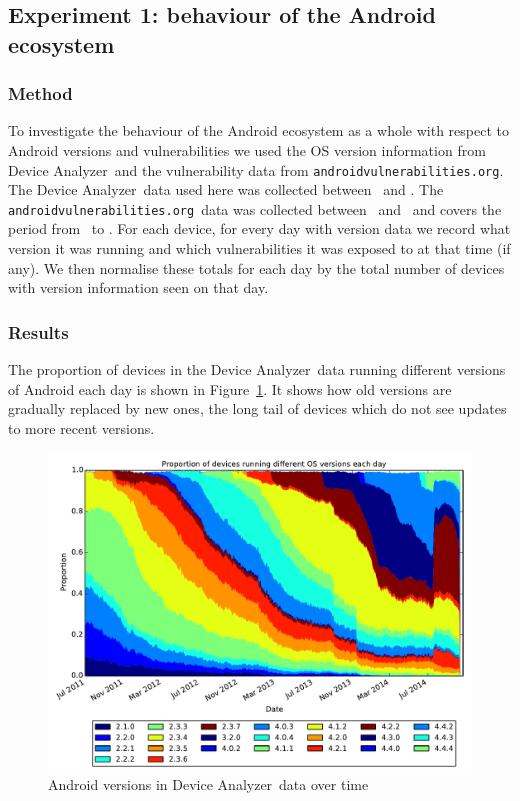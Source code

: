 \documentclass[conference,a4paper,twoside]{IEEEtran}
\newcommand{\da}{Device Analyzer}
\newcommand{\avo}{\texttt{androidvulnerabilities.org}}
\begin{document}

\subsection{Experiment 1: behaviour of the Android ecosystem}\label{sec:exp:android_ecosystem}

\subsubsection{Method}
To investigate the behaviour of the Android ecosystem as a whole with respect to Android versions and vulnerabilities we used the OS version information from \da\ and the vulnerability data from \avo.
The \da\ data used here was collected between \daStartDate\ and \daEndDate.
The \avo\ data was collected between \avoStartDate\ and \avoEndDate\ and covers the period from \avoFirstDataDate\ to \avoLastDataDate.
For each device, for every day with version data we record what version it was running and which vulnerabilities it was exposed to at that time (if any).
We then normalise these totals for each day by the total number of devices with version information seen on that day.

\subsubsection{Results}
The proportion of devices in the \da\ data running different versions of Android each day is shown in Figure~\ref{fig:norm_os}.
It shows how old versions are gradually replaced by new ones, the long tail of devices which do not see updates to more recent versions.

\begin{figure}
 \centering
 \includegraphics[width=\columnwidth]{figures/da_norm_os}
 \caption{Android versions in \da\ data over time}
 \label{fig:norm_os}
\end{figure}
\end{document}
